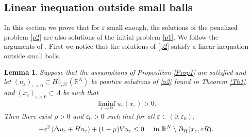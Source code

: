 \documentclass[a4paper]{amsart}
\newtheorem{lemma}[proposition]{Lemma}
\begin{document}
\subsection{Linear inequation outside small balls}
In this section we prove that for $\varepsilon$ small enough, the solutions of the penalized problem \eqref{p2} are also
solutions of the initial problem \eqref{p1}. We follow the arguments of \cite{MVS}. First we notice that the solutions
of \eqref{p2} satisfy a linear inequation outside small balls.
\begin{lemma}\label{lemma:subsol}
 Suppose that the assumptions of Proposition \ref{Prop1} are satisfied and let $(u_{\varepsilon})_{\varepsilon>0} \subset
H^1_{V,\mathcal{H}}({\mathbb{R}}^N)$ be positive solutions of \eqref{p2} found in Theorem \ref{Th1} and
$(x_{\varepsilon})_{\varepsilon>0} \subset \Lambda$ be such that
\begin{align*}
 \liminf_{\varepsilon\to 0} u_{\varepsilon}(x_{\varepsilon}) > 0.
\end{align*}
Then there exist $\rho > 0$ and $\varepsilon_0>0$ such that for all $\varepsilon \in (0,\varepsilon_0)$,
\begin{align}\label{lowsol}
 -\varepsilon^2 \left( \Delta u_{\varepsilon} + H u_{\varepsilon} \right) + (1 - \mu)V u_{\varepsilon} \leq 0 \hspace{0.5cm}
\text{in}\ {\mathbb{R}}^N\setminus B_\mathcal{H}(x_{\varepsilon},\varepsilon R).
\end{align}
\end{lemma}
\end{document}
